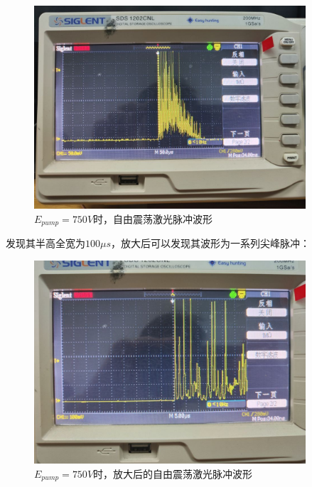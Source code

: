\documentclass[a4paper,UTF8]{ctexart}
\begin{document}
\begin{figure}[H]
    \centering
    \begin{minipage}[b]{0.9\textwidth}
        \centering
        \includegraphics[width=0.9\textwidth]{./ffig2.jpg}
        \caption{$E_{pump} = 750V$时，自由震荡激光脉冲波形}
    \end{minipage}
\end{figure}

发现其半高全宽为$100\mu s$，放大后可以发现其波形为一系列尖峰脉冲：

\begin{figure}[H]
    \centering
    \begin{minipage}[b]{0.9\textwidth}
        \centering
        \includegraphics[width=0.9\textwidth]{./ffig3.jpg}
        \caption{$E_{pump} = 750V$时，放大后的自由震荡激光脉冲波形}
    \end{minipage}
\end{figure}
\end{document}
